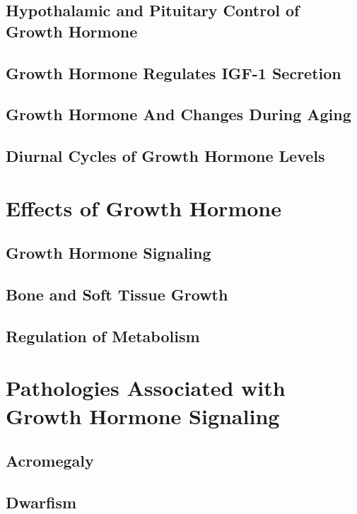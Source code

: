 \documentclass{tufte-handout}
\begin{document}
\subsection{Hypothalamic and Pituitary Control of Growth Hormone}

\subsection{Growth Hormone Regulates IGF-1 Secretion}

\subsection{Growth Hormone And Changes During Aging}

\subsection{Diurnal Cycles of Growth Hormone Levels}

\section{Effects of Growth Hormone}

\subsection{Growth Hormone Signaling}

\subsection{Bone and Soft Tissue Growth}

\subsection{Regulation of Metabolism}

\section{Pathologies Associated with Growth Hormone Signaling}

\subsection{Acromegaly}

\subsection{Dwarfism}

\listoffigures
\listoftables



\end{document}
